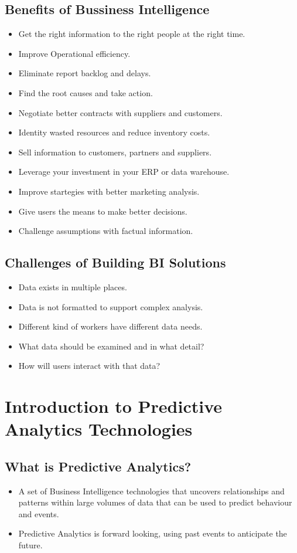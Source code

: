 \documentclass{book}
\begin{document}
\subsection{Benefits of Bussiness Intelligence}
\begin{itemize}
\item Get the right information to the right people at the right time.
\item Improve Operational efficiency.
\item Eliminate report backlog and delays.
\item Find the root causes and take action.
\item Negotiate better contracts with suppliers and customers.
\item Identity wasted resources and reduce inventory costs.
\item Sell information to customers, partners and suppliers.
\item Leverage your investment in your ERP or data warehouse.
\item Improve startegies with better marketing analysis.
\item Give users the means to make better decisions.
\item Challenge assumptions with factual information.
\end{itemize}

\subsection{Challenges of Building BI Solutions}
\begin{itemize}
\item Data exists in multiple places.
\item Data is not formatted to support complex analysis.
\item Different kind of workers have different data needs.
\item What data should be examined and in what detail?
\item How will users interact with that data?
\end{itemize}

\section{Introduction to Predictive Analytics Technologies}
\subsection{What is Predictive Analytics?}
\begin{itemize}
\item A set of Business Intelligence technologies that uncovers relationships and patterns within large volumes of data that can be used to predict behaviour and events.
\item Predictive Analytics is forward looking, using past events to anticipate the future.
\end{itemize}
\end{document}
